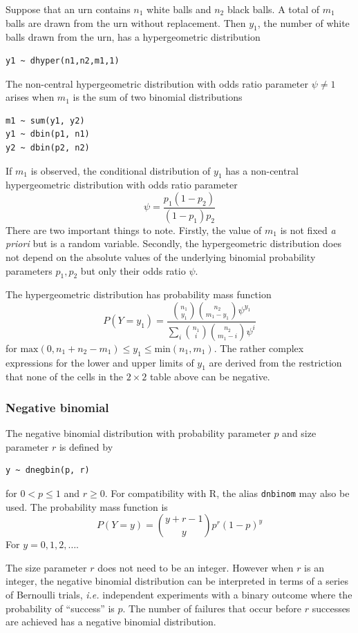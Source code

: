 \documentclass[11pt, a4paper, titlepage]{report}
\newcommand{\R}{\textsf{R}}
\begin{document}
Suppose that an urn contains $n_1$ white balls and $n_2$ black balls.
A total of $m_1$ balls are drawn from the urn without replacement.
Then $y_1$, the number of white balls drawn from the urn, has a
hypergeometric distribution
\begin{verbatim}
y1 ~ dhyper(n1,n2,m1,1)
\end{verbatim}

The non-central hypergeometric distribution with odds ratio parameter
$\psi \neq 1$ arises when $m_1$ is the sum of two binomial distributions
\begin{verbatim}
m1 ~ sum(y1, y2)
y1 ~ dbin(p1, n1)
y2 ~ dbin(p2, n2)
\end{verbatim}
If $m_1$ is observed, the conditional distribution of $y_1$ has a
non-central hypergeometric distribution with odds ratio parameter
\[
\psi = \frac{p_1 (1 - p_2)}{(1 - p_1) p_2}
\]
There are two important things to note. Firstly, the value of $m_1$ is
not fixed {\em a priori} but is a random variable. Secondly, the
hypergeometric distribution does not depend on the absolute values of
the underlying binomial probability parameters $p_1, p_2$ but only
their odds ratio $\psi$.

The hypergeometric distribution has probability mass function
\[
P(Y=y_1) = \frac{ {n_1 \choose y_1} {n_2 \choose m_1 - y_1} \psi^{y_1}}
{ \sum_i {n_1 \choose i} {n_2 \choose m_1 - i} \psi^i}
\]
for $\text{max}(0, n_1 + n_2 - m_1) \leq y_1 \leq
\text{min}(n_1,m_1)$.  The rather complex expressions for the lower
and upper limits of $y_1$ are derived from the restriction that none
of the cells in the $2 \times 2$ table above can be negative.

\subsubsection{Negative binomial}

The negative binomial distribution with probability parameter $p$
and size parameter $r$ is defined by
\begin{verbatim}
y ~ dnegbin(p, r)
\end{verbatim}
for $0 < p \leq 1$ and $r \geq 0$. For compatibility with \R, the
alias \texttt{dnbinom} may also be used. The probability mass function is
\[
P(Y=y) = {y + r -1 \choose y} p^r (1-p)^y
\]
For $y = 0, 1, 2, \ldots$.

The size parameter $r$ does not need to be an integer. However when
$r$ is an integer, the negative binomial distribution can be
interpreted in terms of a series of Bernoulli trials, {\em i.e.}
independent experiments with a binary outcome where the probability of
``success'' is $p$. The number of failures that occur before $r$
successes are achieved has a negative binomial distribution.
\end{document}
